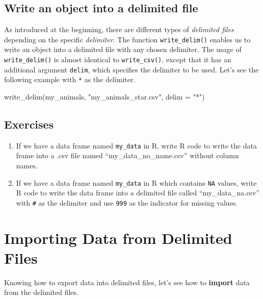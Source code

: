\documentclass[
]{book}
\newenvironment{Shaded}{\begin{snugshade}}{\end{snugshade}}
\newcommand{\AttributeTok}[1]{\textcolor[rgb]{0.77,0.63,0.00}{#1}}
\newcommand{\FunctionTok}[1]{\textcolor[rgb]{0.00,0.00,0.00}{#1}}
\newcommand{\NormalTok}[1]{#1}
\newcommand{\StringTok}[1]{\textcolor[rgb]{0.31,0.60,0.02}{#1}}
\begin{document}
\hypertarget{write-an-object-into-a-delimited-file}{%
\subsection{Write an object into a delimited file}\label{write-an-object-into-a-delimited-file}}

As introduced at the beginning, there are different types of \emph{delimited files} depending on the specific \emph{delimiter}. The function \texttt{write\_delim()} enables us to write an object into a delimited file with any chosen delimiter. The usage of \texttt{write\_delim()} is almost identical to \texttt{write\_csv()}, except that it has an additional argument \texttt{delim}, which specifies the delimiter to be used. Let's see the following example with \texttt{*} as the delimiter.

\begin{Shaded}
\begin{Highlighting}[]
\FunctionTok{write\_delim}\NormalTok{(my\_animals, }\StringTok{"my\_animals\_star.csv"}\NormalTok{, }\AttributeTok{delim =} \StringTok{"*"}\NormalTok{)}
\end{Highlighting}
\end{Shaded}

\hypertarget{exercises-15}{%
\subsection{Exercises}\label{exercises-15}}

\begin{enumerate}
\def\labelenumi{\arabic{enumi}.}
\item
  If we have a data frame named \texttt{my\_data} in R, write R code to write the data frame into a .csv file named ``my\_data\_no\_name.csv'' without column names.
\item
  If we have a data frame named \texttt{my\_data} in R which contains \texttt{NA} values, write R code to write the data frame into a delimited file called ``my\_data\_na.csv'' with \texttt{\#} as the delimiter and use \texttt{999} as the indicator for missing values.
\end{enumerate}

\hypertarget{import-data}{%
\section{Importing Data from Delimited Files}\label{import-data}}

Knowing how to export data into delimited files, let's see how to \textbf{import} data from the delimited files.
\end{document}
